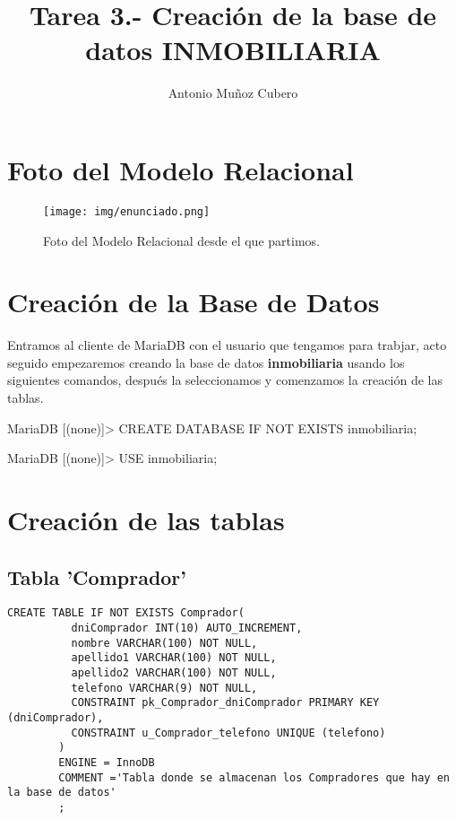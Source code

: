 \documentclass{article}
\title{Tarea 3.- Creación de la base de datos \textbf{INMOBILIARIA}}
\author{Antonio Muñoz Cubero}
\begin{document}
  \maketitle
      \pagestyle{fancy} 

\newpage
  \tableofcontents

\newpage
  \section{Foto del Modelo Relacional}
    \begin{figure}[h]
      \centering
      \texttt{[image: img/enunciado.png]}
      \caption{Foto del Modelo Relacional desde el que partimos.}
    \end{figure}

\newpage
  \section{Creación de la Base de Datos}
    Entramos al cliente de MariaDB con el usuario que tengamos para trabjar, acto seguido empezaremos creando 
    la base de datos \textbf{inmobiliaria} usando los siguientes comandos, después la seleccionamos y comenzamos la creación de las tablas. 
    \begin{listing}[style=consola, numbers=none]
    MariaDB [(none)]> CREATE DATABASE IF NOT EXISTS inmobiliaria;

    MariaDB [(none)]> USE inmobiliaria;

    \end{listing}

  \section{Creación de las tablas}
    \subsection{Tabla 'Comprador'}
      \begin{lstlisting}[style=C]
        CREATE TABLE IF NOT EXISTS Comprador(
          dniComprador INT(10) AUTO_INCREMENT,
          nombre VARCHAR(100) NOT NULL,
          apellido1 VARCHAR(100) NOT NULL,
          apellido2 VARCHAR(100) NOT NULL,
          telefono VARCHAR(9) NOT NULL,
          CONSTRAINT pk_Comprador_dniComprador PRIMARY KEY (dniComprador),
          CONSTRAINT u_Comprador_telefono UNIQUE (telefono)
        )
        ENGINE = InnoDB
        COMMENT ='Tabla donde se almacenan los Compradores que hay en la base de datos'
        ;
      \end{lstlisting}
\end{document}
